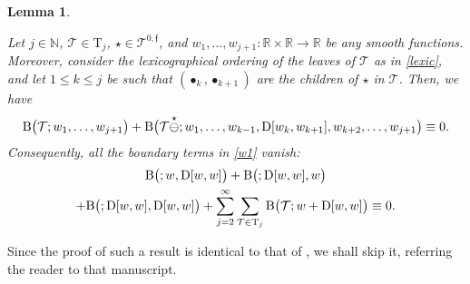 \documentclass[a4paper,
11pt,  reqno]{amsart}
\makeatletter
\newcommand{\5}{\textup{V}}
\newtheorem{lemma}[theorem]{Lemma}
\theoremstyle{remark}
\newcommand{\R}{\mathbb{R}}
\newcommand{\bul}{\bullet}
\newcommand{\TT}{\mathcal{T}}
\newcommand{\Tr}{\mathrm{T}}
\newcommand{\ff}{\mathfrak{f}}
\newcommand{\N}{\mathbb{N}}
\def\<#1>{\csname MH@symb@#1\endcsname}
\numberwithin{equation}{section}
\numberwithin{theorem}{section}
\newcommand{\BB}{\mathrm{B}}
\newcommand{\D}{\mathrm{D}}
\makeatother
\begin{document}
\begin{lemma}
\label{LEM:wbd}




Let $j\in\N$, $\TT\in \Tr_j$, 
$\star \in \TT^{0,\ff}$, and $w_1, \ldots, w_{j+1}: \R\times \R \to \R$ be any smooth functions. Moreover, consider the lexicographical ordering of the leaves of $\TT$ as in \eqref{lexic}, 
and let $1 \le k \le j$ be such that $(\bul_k, \bul_{k+1})$ are the children of $\star$ in $\TT$. 
Then, we have 
\begin{align}
\label{wbd0}
\BB\big(\TT ; w_1, \ldots, w_{j+1} \big) 
+ \BB\big(\TT\overset{\star}{\ominus} \<1>; w_1,  \ldots, w_{k-1} , \D[w_k,w_{k+1}] , w_{k+2}, \ldots,  w_{j+1} \big) 
\equiv 0.
\end{align}
Consequently, all the boundary terms in \eqref{w1} vanish:
\begin{multline}
\label{wbd1}
  \BB \big(\<1>; w, \D[w, w] \big) 
+ \BB\big(\<1>; \D[w, w],w\big) 
\\
+
\BB\big(\<1>;\D[w, w], \D[w, w]\big)
+ \sum_{j=2}^\infty \sum_{\TT\in \Tr_j}  \BB\big(\TT; w + \D[w, w]\big)  \equiv 0  .
\end{multline}


\end{lemma}

Since the proof of such a result is identical to that of \cite[Lemma~2.8]{chcora}, we shall skip it, referring the reader to that manuscript. 
\end{document}
